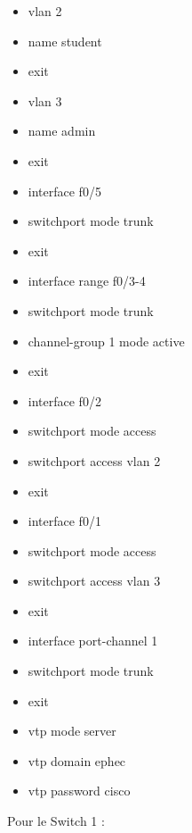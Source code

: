 \documentclass[a4paper,10pt,final,fleqn]{article}
\begin{document}
	\begin{itemize}
		\item vlan 2
		\item name student
		\item exit
		\item vlan 3
		\item name admin
		\item exit
		\item interface f0/5
		\item switchport mode trunk
		\item exit
		\item interface range f0/3-4
		\item switchport mode trunk
		\item channel-group 1 mode active
		\item exit
		\item interface f0/2
		\item switchport mode access
		\item switchport access vlan 2
		\item exit
		\item interface f0/1
		\item switchport mode access
		\item switchport access vlan 3
		\item exit
		\item interface port-channel 1
		\item switchport mode trunk
		\item exit 
		\item vtp mode server
		\item vtp domain ephec
		\item vtp password cisco\\
	\end{itemize}

	Pour le Switch 1 : \\
\end{document}
